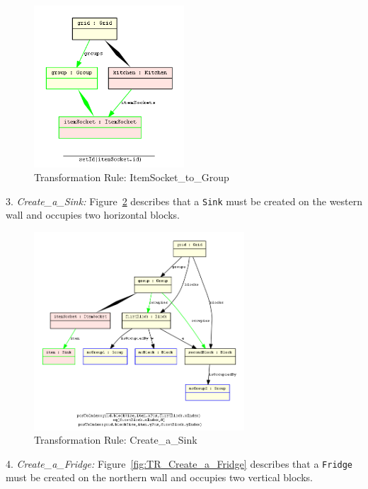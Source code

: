 \begin{figure}[h]
	\centering
	\includegraphics[width=0.5\textwidth]{figures/TR_ItemSocket_to_Group}
	\caption{Transformation Rule: ItemSocket\_to\_Group}
	\label{fig:TR_ItemSocket_to_Group}
\end{figure}

3. \textit{Create\_a\_Sink: } Figure~\ref{fig:TR_Create_a_Sink} describes that a \texttt{Sink} must be created on the western wall and occupies two horizontal blocks.

\begin{figure}[h]
	\centering
	\includegraphics[width=0.7\textwidth]{figures/TR_Create_a_Sink}
	\caption{Transformation Rule: Create\_a\_Sink}
	\label{fig:TR_Create_a_Sink}
\end{figure}

4. \textit{Create\_a\_Fridge: } Figure~\ref{fig:TR_Create_a_Fridge} describes that a \texttt{Fridge} must be created on the northern wall and occupies two vertical blocks.

